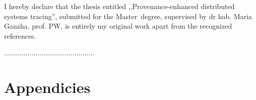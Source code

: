 \documentclass[a4paper,11pt,twoside,usenames,dvipsnames]{report}
\makeatletter
\renewcommand{\cftchapaftersnum}{.}%
\renewcommand{\cftsecaftersnum}{.}%
\renewcommand{\cftsubsecaftersnum}{.}%
\def\cleardoublepage{\clearpage\if@twoside
\ifodd\c@page\else\hbox{}\thispagestyle{empty}\newpage
\if@twocolumn\hbox{}\newpage\fi\fi\fi}
\theoremstyle{definition}
\renewcommand{\title}{Provenance-enhanced distributed systems tracing}
\newcommand{\type}{Master}
\newcommand{\supervisor}{dr hab. Maria Ganzha, prof. PW} %
\makeatother
\begin{document}
I hereby declare that the thesis entitled ,,\title '', submitted for the \type ~degree, supervised  by \supervisor , is entirely my original work apart from the recognized references.
\vspace{2cm}

\begin{flushright}
  \begin{minipage}{50mm}
    \begin{center}
      ..............................................

    \end{center}
  \end{minipage}
\end{flushright}

\thispagestyle{empty}
\newpage

\null\thispagestyle{empty}\newpage
\setcounter{page}{9}
\tableofcontents
\thispagestyle{empty}
\newpage %



\null\thispagestyle{empty}\newpage
\pagestyle{fancy}

%










\cleardoublepage %
\printbibliography[heading=bibintoc]

\thispagestyle{empty}


\clearpage %
\listoffigures
\thispagestyle{empty}

\renewcommand{\cftchapaftersnum}{}%
\renewcommand{\cftsecaftersnum}{}%
\renewcommand{\cftsubsecaftersnum}{}%

\chapter*{Appendicies}

\thispagestyle{empty}
\end{document}
